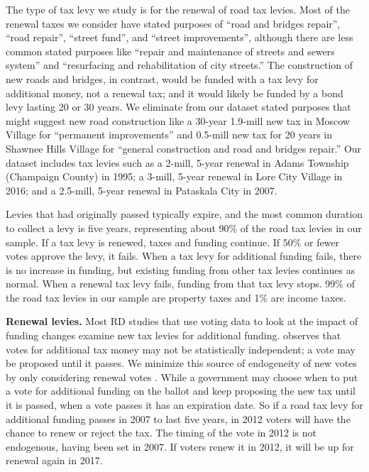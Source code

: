 The type of tax levy we study is for the renewal of road tax levies. Most of the renewal taxes we consider have stated purposes of “road and bridges repair”, “road repair”, “street fund”, and “street improvements”, although there are less common stated purposes like “repair and maintenance of streets and sewers system” and “resurfacing and rehabilitation of city streets.”  The construction of new roads and bridges, in contrast, would be funded with a tax levy for additional money, not a renewal tax; and it would likely be funded by a bond levy lasting 20 or 30 years.  We eliminate from our dataset stated purposes that might suggest new road construction like a 30-year 1.9-mill new tax in Moscow Village for “permanent improvements” and 0.5-mill new tax for 20 years in Shawnee Hills Village for “general construction and road and bridges repair.” Our dataset includes tax levies such as a 2-mill, 5-year renewal in Adams Township (Champaign County) in 1995; a 3-mill, 5-year renewal in Lore City Village in 2016; and a 2.5-mill, 5-year renewal in Pataskala City in 2007.

 Levies that had originally passed typically expire, and the most common duration to collect a levy is five years, representing about 90\% of the road tax levies in our sample.  If a tax levy is renewed, taxes and funding continue.  If 50\% or fewer votes approve the levy, it fails.  When a tax levy for additional funding fails, there is no increase in funding, but existing funding from other tax levies continues as normal.  When a renewal tax levy fails, funding from that tax levy stops.  99\% of the road tax levies in our sample are property taxes and 1\% are income taxes.

{\bf Renewal levies.} Most RD studies that use voting data to look at the impact of funding changes examine new tax levies for additional funding.  \cite{cellini2010value} observes that votes for additional tax money may not be statistically independent; a vote may be proposed until it passes.  We minimize this source of endogeneity of new votes by only considering renewal votes \citep{brasington2017school}.  While a government may choose when to put a vote for additional funding on the ballot and keep proposing the new tax until it is passed, when a vote passes it has an expiration date.  So if a road tax levy for additional funding passes in 2007 to last five years, in 2012 voters will have the chance to renew or reject the tax.  The timing of the vote in 2012 is not endogenous, having been set in 2007.  If voters renew it in 2012, it will be up for renewal again in 2017. 

